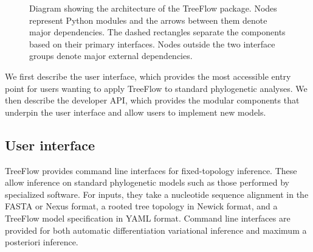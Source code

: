 \documentclass[oupdraft]{sysbio_sse}
\begin{document}
\newlength{\originalbaselineskip}
\setlength{\originalbaselineskip}{\baselineskip}

\begin{figure}
    \centering
    
    \caption{Diagram showing the architecture of the TreeFlow package. Nodes represent Python modules and the arrows between them denote major dependencies. The dashed rectangles separate the components based on their primary interfaces. Nodes outside the two interface groups denote major external dependencies.}
    \label{fig:architecture}
\end{figure}

\setlength{\baselineskip}{\originalbaselineskip}

We first describe the user interface, which provides the most accessible entry point for users wanting to apply TreeFlow to standard phylogenetic analyses. We then describe the developer API, which provides the modular components that underpin the user interface and allow users to implement new models.

\subsection{User interface}

TreeFlow provides command line interfaces for fixed-topology inference. These allow inference on standard phylogenetic models such as those performed by specialized software. For inputs, they take a nucleotide sequence alignment in the FASTA or Nexus format, a rooted tree topology in Newick format, and a TreeFlow model specification in YAML format. Command line interfaces are provided for both automatic differentiation variational inference and maximum a posteriori inference.
\end{document}
